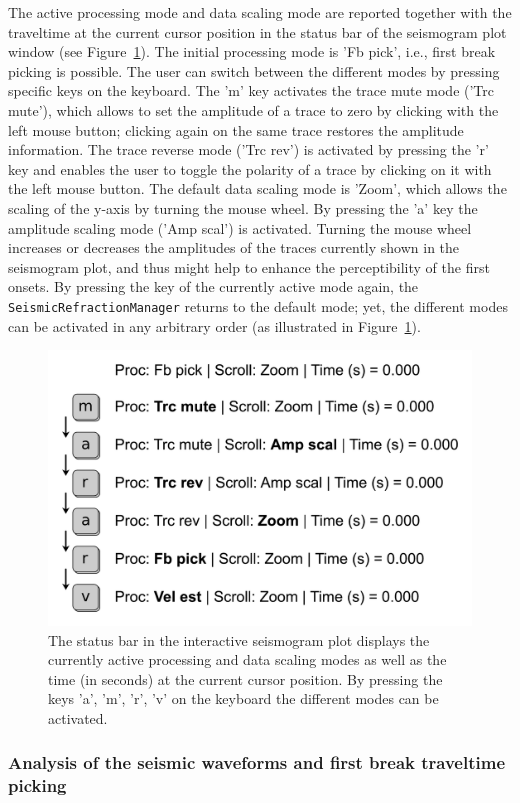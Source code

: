 \documentclass[a4paper,fleqn]{cas-sc}
\begin{document}
The active processing mode and data scaling mode are reported together with the traveltime at the current cursor position in the status bar of the seismogram plot window (see Figure~\ref{fig:statusbar_intro}).
The initial processing mode is 'Fb pick', i.e., first break picking is possible. The user can switch between the different modes by pressing specific keys on the keyboard. The 'm' key activates the trace mute mode ('Trc mute'), which allows to set the amplitude of a trace to zero by clicking with the left mouse button; clicking again on the same trace restores the amplitude information. The trace reverse mode ('Trc rev') is activated by pressing the 'r' key and enables the user to toggle the polarity of a trace by clicking on it with the left mouse button. 
The default data scaling mode is 'Zoom', which allows the scaling of the y-axis by turning the mouse wheel. By pressing the 'a' key the amplitude scaling mode ('Amp scal') is activated. Turning the mouse wheel increases or decreases the amplitudes of the traces currently shown in the seismogram plot, and thus might help to enhance the perceptibility of the first onsets.
By pressing the key of the currently active mode again, the \texttt{SeismicRefractionManager} returns to the default mode; yet, the different modes can be activated in any arbitrary order (as illustrated in Figure~\ref{fig:statusbar_intro}).
\begin{figure}
	\centering
	\includegraphics[width=.75\textwidth]{figures/status_bar.pdf}
	\caption{The status bar in the interactive seismogram plot displays the currently active processing and data scaling modes as well as the time (in seconds) at the current cursor position. By pressing the keys 'a', 'm', 'r', 'v' on the keyboard the different modes can be activated.}
	\label{fig:statusbar_intro}
\end{figure}

\subsubsection{Analysis of the seismic waveforms and first break traveltime picking}
\end{document}

